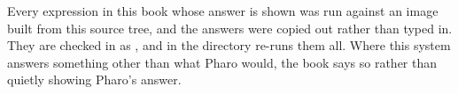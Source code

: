 \begin{stnote}
Every expression in this book whose answer is shown was run against an image
built from this source tree, and the answers were copied out rather than typed
in. They are checked in as ,
and  in the  directory re-runs them all. Where
this system answers something other than what Pharo would, the book says so
rather than quietly showing Pharo's answer.
\end{stnote}
